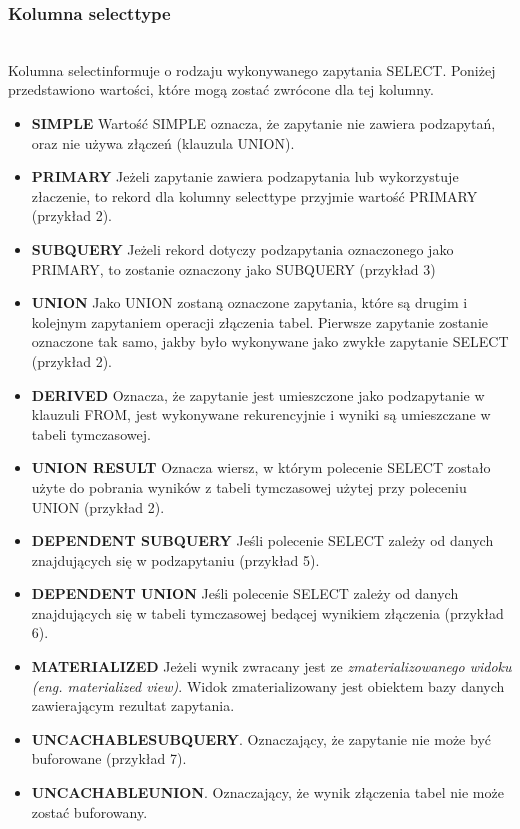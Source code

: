 \subsubsection{Kolumna select\textunderscore type}\leavevmode\\
Kolumna select\textunderscore informuje o rodzaju wykonywanego zapytania SELECT. 
Poniżej przedstawiono wartości, które mogą zostać zwrócone dla tej kolumny.
\begin{itemize}
	\item \textbf{SIMPLE} Wartość SIMPLE oznacza, że zapytanie nie zawiera podzapytań, oraz nie używa złączeń (klauzula UNION).
	\item \textbf{PRIMARY} Jeżeli zapytanie zawiera podzapytania lub wykorzystuje złaczenie, to rekord dla kolumny select\textunderscore type przyjmie wartość PRIMARY (przykład 2).
	\item \textbf{SUBQUERY} Jeżeli rekord dotyczy podzapytania oznaczonego jako PRIMARY, to zostanie oznaczony jako SUBQUERY (przykład 3)
	\item \textbf{UNION} Jako UNION zostaną oznaczone zapytania, które są drugim i kolejnym zapytaniem operacji złączenia tabel. Pierwsze zapytanie zostanie oznaczone tak samo, jakby było wykonywane jako zwykłe zapytanie SELECT (przykład 2).
	\item \textbf{\textbf{DERIVED}} Oznacza, że zapytanie jest umieszczone jako podzapytanie w klauzuli FROM, jest wykonywane rekurencyjnie i wyniki są umieszczane w tabeli tymczasowej.
	\item \textbf{UNION RESULT} Oznacza wiersz, w którym polecenie SELECT zostało użyte do pobrania wyników z tabeli tymczasowej użytej przy poleceniu UNION (przykład 2).
	\item \textbf{DEPENDENT SUBQUERY} Jeśli polecenie SELECT zależy od danych znajdujących się w podzapytaniu (przykład 5).
	\item \textbf{DEPENDENT UNION} Jeśli polecenie SELECT zależy od danych znajdujących się w tabeli tymczasowej bedącej wynikiem złączenia (przykład 6).
	\item \textbf{\textbf{MATERIALIZED}} Jeżeli wynik zwracany jest ze \textit{zmaterializowanego widoku (eng. materialized view)}. Widok zmaterializowany jest obiektem bazy danych zawierającym rezultat zapytania.
	\item \textbf{UNCACHABLE\textunderscore SUBQUERY}. Oznaczający, że zapytanie nie może być buforowane (przykład 7).
	\item \textbf{UNCACHABLE\textunderscore UNION}. Oznaczający, że wynik złączenia tabel nie może zostać buforowany.
\end{itemize}

